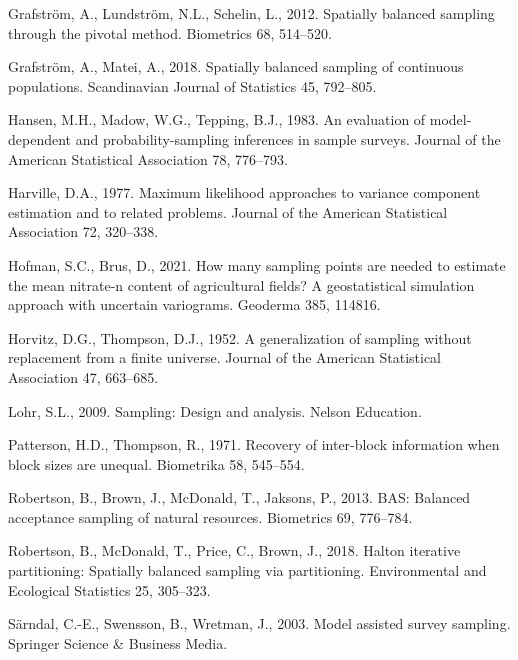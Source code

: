 \documentclass[]{elsarticle} %
\begin{document}
\leavevmode\hypertarget{ref-grafstrom2012spatially}{}%
Grafström, A., Lundström, N.L., Schelin, L., 2012. Spatially balanced
sampling through the pivotal method. Biometrics 68, 514--520.

\leavevmode\hypertarget{ref-grafstrom2018spatially}{}%
Grafström, A., Matei, A., 2018. Spatially balanced sampling of
continuous populations. Scandinavian Journal of Statistics 45, 792--805.

\leavevmode\hypertarget{ref-hansen1983evaluation}{}%
Hansen, M.H., Madow, W.G., Tepping, B.J., 1983. An evaluation of
model-dependent and probability-sampling inferences in sample surveys.
Journal of the American Statistical Association 78, 776--793.

\leavevmode\hypertarget{ref-harville1977maximum}{}%
Harville, D.A., 1977. Maximum likelihood approaches to variance
component estimation and to related problems. Journal of the American
Statistical Association 72, 320--338.

\leavevmode\hypertarget{ref-hofman2021many}{}%
Hofman, S.C., Brus, D., 2021. How many sampling points are needed to
estimate the mean nitrate-n content of agricultural fields? A
geostatistical simulation approach with uncertain variograms. Geoderma
385, 114816.

\leavevmode\hypertarget{ref-horvitz1952generalization}{}%
Horvitz, D.G., Thompson, D.J., 1952. A generalization of sampling
without replacement from a finite universe. Journal of the American
Statistical Association 47, 663--685.

\leavevmode\hypertarget{ref-lohr2009sampling}{}%
Lohr, S.L., 2009. Sampling: Design and analysis. Nelson Education.

\leavevmode\hypertarget{ref-patterson1971recovery}{}%
Patterson, H.D., Thompson, R., 1971. Recovery of inter-block information
when block sizes are unequal. Biometrika 58, 545--554.

\leavevmode\hypertarget{ref-robertson2013bas}{}%
Robertson, B., Brown, J., McDonald, T., Jaksons, P., 2013. BAS: Balanced
acceptance sampling of natural resources. Biometrics 69, 776--784.

\leavevmode\hypertarget{ref-robertson2018halton}{}%
Robertson, B., McDonald, T., Price, C., Brown, J., 2018. Halton
iterative partitioning: Spatially balanced sampling via partitioning.
Environmental and Ecological Statistics 25, 305--323.

\leavevmode\hypertarget{ref-sarndal2003model}{}%
Särndal, C.-E., Swensson, B., Wretman, J., 2003. Model assisted survey
sampling. Springer Science \& Business Media.
\end{document}
